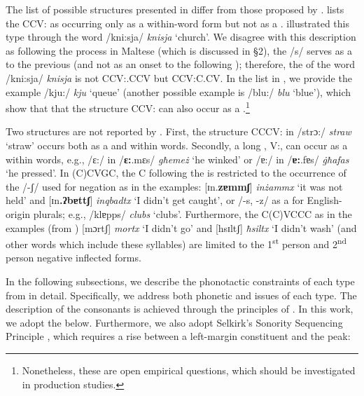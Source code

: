 \documentclass[output=paper]{langsci/langscibook}
\begin{document}
\newpage
The list of possible  structures presented in  differ from those proposed by \citet{camilleri2014stem}. \citet{camilleri2014stem} lists the  CCV: as occurring only as a within-word form but not as a . \citet{camilleri2014stem} illustrated this type through the word /kni:sja/ \textit{knisja} ‘church’. We disagree with this description as following the  process in Maltese (which is discussed in §2), the /s/ serves as a  to the previous  (and not as an onset to the following ); therefore, the  of the word /kni:sja/ \textit{knisja} is not CCV:.CCV but CCV:C.CV. In the list in , we provide the example /kju:/ \textit{kju} ‘queue’ (another possible example is /blu:/ \textit{blu} ‘blue’), which show that that the structure CCV: can also occur as a .\footnote{Nonetheless, these are open empirical questions, which should be investigated in production studies.}  

Two structures are not reported by \citet{camilleri2014stem}. First, the structure CCCV: in /strɔ:/ \textit{straw} ‘straw’ occurs both as a  and within words. Secondly, a long , V:, can occur as a  within words, e.g., /ɛ:/ in /\textbf{ɛ:}.mɛs/ \textit{għemeż} ‘he winked’ or /ɐ:/ in /\textbf{ɐ:}.fɐs/ \textit{\.għafas} ‘he pressed’. In (C)CVGC, the C following the  is restricted to the occurrence of the  /-ʃ/ used for negation as in the examples: [ɪn.\textbf{zɐmmʃ}] \textit{inżammx} ‘it was not held’ and [ɪn\textbf{.ʔbɐttʃ}] \textit{inqbadtx} ‘I didn’t get caught’, or /-s, -z/ as a  for English-origin plurals; e.g., /klɐpps/ \textit{clubs} ‘clubs’. Furthermore, the  C(C)VCCC as in the examples (from ) [mɔrtʃ] \textit{mortx} ‘I didn’t go’ and [hsɪltʃ] \textit{ħsiltx} ‘I didn’t wash’ (and other words which include these syllables) are limited to the 1\textsuperscript{st} person and 2\textsuperscript{nd} person negative inflected forms.

In the following subsections, we describe the phonotactic constraints of each  type from  in detail. Specifically, we address both phonetic and  issues of each  type. The description of the  consonants is achieved through the principles of  \citep[for codas cf.][]{lukediss}. In this work, we adopt the  below. Furthermore, we also adopt Selkirk’s Sonority Sequencing Principle \citep{selkirk1984major}, which requires a  rise between a left-margin constituent and the  peak: 
\end{document}
